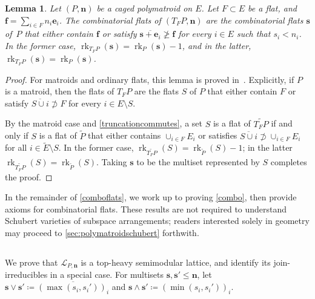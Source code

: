 \documentclass[11pt]{article}
\newtheorem{lemm}[theo]{Lemma}
\theoremstyle{definition}
\numberwithin{equation}{section}
\DeclareMathOperator{\rk}{rk}
\begin{document}
\begin{lemm}\label{truncation}
  Let $(P, \mathbf n)$ be a caged polymatroid on $E$.
  Let $F \subset E$ be a flat, and $\mathbf f = \sum_{i \in F} n_i \mathbf e_i$.
  The combinatorial flats of $(T_F P, \mathbf n)$ are the combinatorial flats $\mathbf s$ of~$P$ that either contain $\mathbf f$ or satisfy  $\overline{\mathbf s +  \mathbf e_i} \not \geq \mathbf f$ for every $i \in E$ such that $s_i < n_i$.
  In the former case, $\rk_{T_FP}(\mathbf s) = \rk_P(\mathbf s) - 1$, and in the latter, $\rk_{T_FP}(\mathbf s) = \rk_P(\mathbf s)$.
\end{lemm}
\begin{proof}
  For matroids and ordinary flats, this lemma is proved in~\cite[Proposition 7.4.9]{B86}. Explicitly, if $P$ is a matroid, then the flats of $T_F P$ are the flats $S$ of $P$ that either contain $F$ or satisfy $\overline{S \cup i} \not \supset F$ for every $i \in E \setminus S$.
  
  By the matroid case and \cref{truncationcommutes}, a set $S$ is a flat of $\widetilde{T_F P}$ if and only if $S$ is a flat of $\widetilde P$ that either contains $\cup_{i \in F} E_i$ or satisfies $\overline{S \cup i} \not \supset \cup_{i \in F} E_i$ for all $i \in \widetilde E \setminus S$. In the former case, $\rk_{\widetilde{T_F P}}(S) = \rk_{\widetilde P}(S) - 1$; in the latter $\rk_{\widetilde{T_FP}}(S) = \rk_{\widetilde P}(S)$.
Taking $\mathbf s$ to be the multiset represented by $S$ completes the proof.
\end{proof}

In the remainder of \cref{comboflats}, we work up to proving \cref{combo}, then provide axioms for combinatorial flats.
These results are not required to understand Schubert varieties of subspace arrangements; readers interested solely in geometry may proceed to  \cref{sec:polymatroidschubert} forthwith.

\subsection{}\label{posetprops}
We prove that $\mathcal L_{P, \mathbf n}$ is a top-heavy semimodular lattice, and identify its join-irreducibles in a special case.
For multisets $\mathbf s, \mathbf s' \leq \mathbf n$, let  $\mathbf s \vee \mathbf s' \coloneqq \overline{(\max(s_i, s_i'))_i}$ and $\mathbf s \wedge \mathbf s' \coloneqq (\min(s_i, s_i'))_i$.
\end{document}

